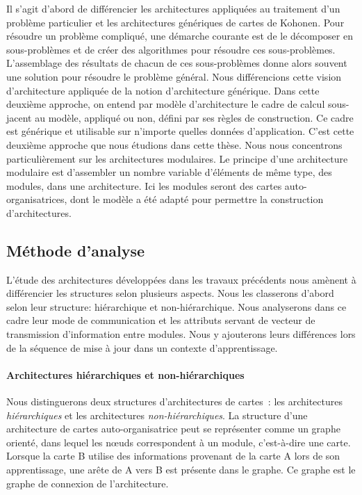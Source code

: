 \documentclass[../main]{subfiles}
\begin{document}
Il s'agit d'abord de différencier les architectures appliquées au traitement d'un problème particulier et les architectures génériques de cartes de Kohonen.
Pour résoudre un problème compliqué, une démarche courante est de le décomposer en sous-problèmes et de créer des algorithmes pour résoudre ces sous-problèmes. L'assemblage des résultats de chacun de ces sous-problèmes donne alors souvent une solution pour résoudre le problème général.
Nous différencions cette vision d'architecture appliquée de la notion d'architecture générique. 
Dans cette deuxième approche, on entend par modèle d'architecture le cadre de calcul sous-jacent au modèle, appliqué ou non, défini par ses règles de construction. Ce cadre est générique et utilisable sur n'importe quelles données d'application. C'est cette deuxième approche que nous étudions dans cette thèse. Nous nous concentrons particulièrement sur les architectures modulaires.
Le principe d'une architecture modulaire est d'assembler un nombre variable d'éléments de même type, des modules, dans une architecture. Ici les modules seront des cartes auto-organisatrices, dont le modèle a été adapté pour permettre la construction d'architectures.

\subsection{Méthode d'analyse}

L'étude des architectures développées dans les travaux précédents nous amènent à différencier les structures selon plusieurs aspects. Nous les classerons d'abord selon leur structure: hiérarchique et non-hiérarchique.
Nous analyserons dans ce cadre leur mode de communication et les attributs servant de vecteur de transmission d'information entre modules. Nous y ajouterons leurs différences lors de la séquence de mise à jour dans un contexte d'apprentissage.

\paragraph{Architectures hiérarchiques et non-hiérarchiques}

Nous distinguerons deux structures d'architectures de cartes~: les architectures \emph{hiérarchiques} et  les architectures \emph{non-hiérarchiques}.
La structure d'une architecture de cartes auto-organisatrice peut se représenter comme un graphe orienté, dans lequel les n\oe{}uds correspondent à un module, c'est-à-dire une carte. Lorsque la carte B utilise des informations provenant de la carte A lors de son apprentissage, une arête de A vers B est présente dans le graphe. Ce graphe est le graphe de connexion de l'architecture.
\end{document}
